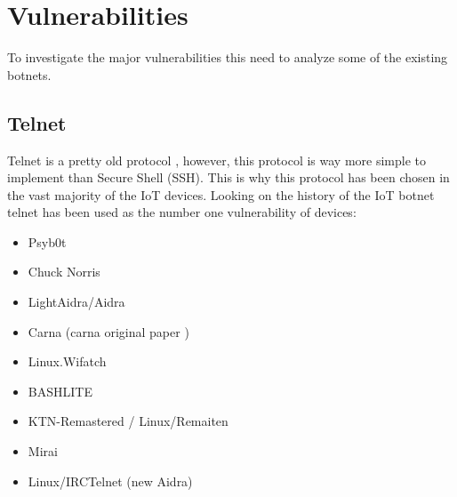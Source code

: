 \documentclass{report}
\begin{document}
\section{Vulnerabilities}
\label{sec:vulnerabilities}
To investigate the major vulnerabilities this need to analyze some of the existing botnets.

\subsection{Telnet}
Telnet is a pretty old protocol \autocite{davidson1977arpanet}, however, this protocol is way more simple to implement than Secure Shell (SSH). This is why this protocol has been chosen in the vast majority of the IoT devices. Looking on the history of the IoT botnet telnet has been used as the number one vulnerability of devices:

\begin{itemize}
 \item Psyb0t \autocite{durfina2013psybot}
 \item Chuck Norris \autocite{celeda2010embedded}
 \item LightAidra/Aidra \autocite{aidra}
 \item Carna \autocite{krenc2014internet} (carna original paper \autocite{carna})
 \item Linux.Wifatch \autocite{wifatch}
 \item BASHLITE \autocite{bashlite}
 \item KTN-Remastered / Linux/Remaiten \autocite{remaiten}
 \item Mirai \autocite{kolias2017ddos}
 \item Linux/IRCTelnet (new Aidra) \autocite{irctelnet}
\end{itemize}
\end{document}
